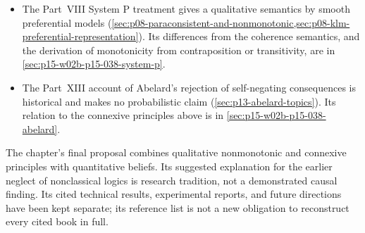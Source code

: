 \begin{itemize}
      It supplies neither this conditional-event semantics nor its
      Dutch-book consequence relation.
\item The Part~VIII System P treatment gives a qualitative semantics by
      smooth preferential models
      (\cref{sec:p08-paraconsistent-and-nonmonotonic,sec:p08-klm-preferential-representation}).
      Its differences from the coherence semantics, and the derivation
      of monotonicity from contraposition or transitivity, are in
      \cref{sec:p15-w02b-p15-038-system-p}.
\item The Part~XIII account of Abelard's rejection of self-negating
      consequences is historical and makes no probabilistic claim
      (\cref{sec:p13-abelard-topics}). Its relation to the connexive
      principles above is in \cref{sec:p15-w02b-p15-038-abelard}.
\end{itemize}

The chapter's final proposal combines qualitative nonmonotonic and
connexive principles with quantitative beliefs. Its suggested explanation
for the earlier neglect of nonclassical logics is research tradition,
not a demonstrated causal finding. Its cited technical results,
experimental reports, and future directions have been kept separate;
its reference list is not a new obligation to reconstruct every cited
book in full.
